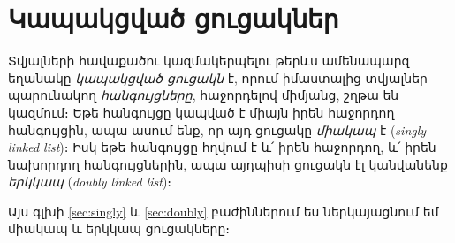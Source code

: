 \chapter{Կապակցված ցուցակներ}

Տվյալների հավաքածու կազմակերպելու թերևս ամենապարզ եղանակը
\emph{կապակցված ցուցակն} է, որում իմաստալից տվյալներ
պարունակող \emph{հանգույցները}, հաջորդելով միմյանց, շղթա
են կազմում։ Եթե հանգույցը կապված է միայն իրեն հաջորդող
հանգույցին, ապա ասում ենք, որ այդ ցուցակը \emph{միակապ} է
(\emph{singly linked list})։ Իսկ եթե հանգույցը հղվում է և՛
իրեն հաջորդող, և՛ իրեն նախորդող հանգույցներին, ապա այդպիսի
ցուցակն էլ կանվանենք \emph{երկկապ} (\emph{doubly linked
list})։

Այս գլխի \ref{sec:singly} և \ref{sec:doubly} բաժիններում
ես ներկայացնում եմ միակապ և երկկապ ցուցակները։




